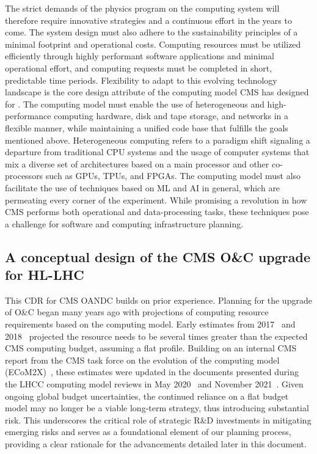 The strict demands of the physics program on the computing system will therefore require innovative strategies and a continuous effort in the years to come. The system design must also adhere to the sustainability principles of a minimal footprint and operational costs. Computing resources must be utilized efficiently through highly performant software applications and minimal operational effort, and computing requests must be completed in short, predictable time periods. Flexibility to adapt to this evolving technology landscape is the core design attribute of the computing model CMS has designed for \PhaseTwo. The computing model must enable the use of heterogeneous and high-performance computing hardware, disk and tape storage, and networks in a flexible manner, while maintaining a unified code base that fulfills the goals mentioned above. Heterogeneous computing refers to a paradigm shift signaling a departure from traditional \gls{CPU} systems and the usage of computer systems that mix a diverse set of architectures based on a main processor and other co-processors such as \glspl{GPU}, \glspl{TPU}, and \glspl{FPGA}. The computing model must also facilitate the use of techniques based on \gls{ML} and \gls{AI} in general, which are permeating every corner of the experiment. While promising a revolution in how CMS performs both operational and data-processing tasks, these techniques pose a challenge for software and computing infrastructure planning.

\subsection{A conceptual design of the CMS O\&C upgrade for HL-LHC}

This \gls{CDR} for CMS \PhaseTwo \gls{OANDC} builds on prior experience. Planning for the \PhaseTwo upgrade of O\&C began many years ago with projections of computing resource requirements based on the \RunTwo computing model. Early estimates from 2017~\cite{Sexton-Kennedy:2018bbg} and 2018~\cite{CMSCompResults} projected the resource needs to be several times greater than the expected CMS \PhaseTwo computing budget, assuming a flat profile. Building on an internal CMS report from the CMS task force on the evolution of the computing model (ECoM2X)~\cite{ecom2x}, these estimates were updated in the documents presented during the \gls{LHCC} computing model reviews in May 2020~\cite{Software:2751565} and November 2021~\cite{Software:2815292}. Given ongoing global budget uncertainties, the continued reliance on a flat budget model may no longer be a viable long-term strategy, thus introducing substantial risk. This underscores the critical role of strategic R\&D investments in mitigating emerging risks and serves as a foundational element of our planning process, providing a clear rationale for the advancements detailed later in this document.

